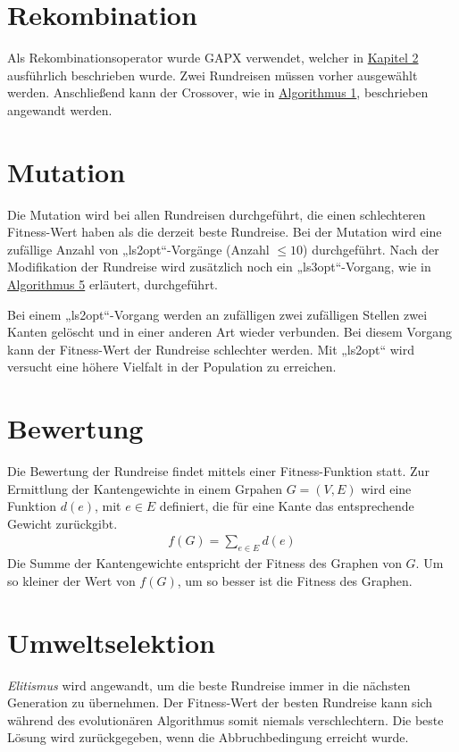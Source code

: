 \section{Rekombination}
Als Rekombinationsoperator wurde GAPX verwendet, welcher in
\hyperref[gapx_einleitung]{Kapitel 2}
ausführlich beschrieben wurde. Zwei Rundreisen müssen vorher ausgewählt
werden. Anschließend kann der Crossover, wie in
\hyperref[alg:crossover_ea]{Algorithmus 1},
beschrieben angewandt werden.
\section{Mutation}
Die Mutation wird bei allen Rundreisen durchgeführt, die einen
schlechteren Fitness-Wert haben als die derzeit beste Rundreise. 
Bei der Mutation wird eine zufällige Anzahl von „ls2opt“-Vorgänge
(Anzahl $\leq 10$) durchgeführt. Nach der Modifikation der Rundreise wird
zusätzlich noch ein „ls3opt“-Vorgang, wie in \hyperref[alg:ls3opt_run]{Algorithmus 5} 
erläutert, durchgeführt.

\begin{bem}
Bei einem „ls2opt“-Vorgang werden an zufälligen zwei zufälligen Stellen
zwei Kanten gelöscht und in einer anderen Art wieder verbunden. Bei
diesem Vorgang kann der Fitness-Wert der Rundreise schlechter werden.
Mit „ls2opt“ wird versucht eine höhere Vielfalt in der Population zu
erreichen.
\end{bem}

\section{Bewertung}
Die Bewertung der Rundreise findet mittels einer Fitness-Funktion statt.
Zur Ermittlung der Kantengewichte in einem Grpahen $G = (V, E)$ wird
eine Funktion $d(e)$, mit $e \in E$ definiert, die für eine Kante das
entsprechende Gewicht zurückgibt.
\begin{align*}
   f(G) = \sum_{e \in E} d(e)
\end{align*}
Die Summe der Kantengewichte entspricht der Fitness des Graphen von
$G$. Um so kleiner der Wert von $f(G)$, um so besser ist die Fitness des
Graphen.

\section{Umweltselektion}
\textit{Elitismus} wird angewandt,
um die beste Rundreise immer in die nächsten Generation zu übernehmen.
Der Fitness-Wert der besten Rundreise kann sich während des
evolutionären Algorithmus somit niemals verschlechtern. Die beste Lösung wird
zurückgegeben, wenn die Abbruchbedingung erreicht wurde.
